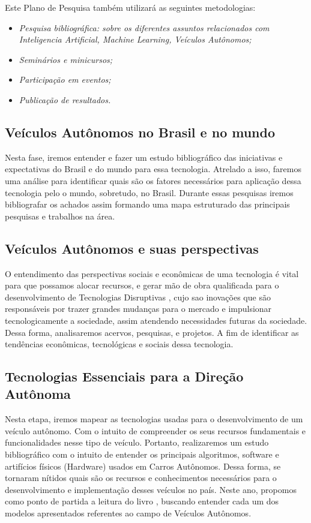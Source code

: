 \documentclass{article}
\begin{document}
\vspace {1mm}

Este Plano de Pesquisa também utilizará as seguintes metodologias:
\begin{itemize}
\item \textit{Pesquisa bibliográfica: sobre os diferentes assuntos relacionados com Inteligencia Artificial, Machine Learning, Veículos Autônomos;
}
\item \textit{Seminários e minicursos;}
\item \textit{Participação em eventos;}
\item \textit{Publicação de resultados.}

\end{itemize}


\subsection{Veículos Autônomos no Brasil e no mundo}

Nesta fase, iremos entender e fazer um estudo bibliográfico das iniciativas e expectativas do Brasil e do mundo para essa tecnologia. Atrelado a isso, faremos uma análise para identificar quais são os fatores necessários para aplicação dessa tecnologia pelo o mundo, sobretudo, no Brasil. Durante essas pesquisas iremos bibliografar os achados assim formando uma mapa estruturado das principais pesquisas e trabalhos na área.


\subsection{Veículos Autônomos e suas perspectivas}

O entendimento das perspectivas sociais e econômicas de uma tecnologia é vital para que possamos alocar recursos, e gerar mão de obra qualificada para o desenvolvimento de Tecnologias Disruptivas \cite{4cenarios_ocidental}, cujo sao inovações que são responsáveis por trazer grandes mudanças para o mercado e impulsionar tecnologicamente a sociedade, assim atendendo necessidades futuras da sociedade. 
Dessa forma,  analisaremos acervos, pesquisas, e projetos. A fim de identificar as tendências econômicas, tecnológicas e sociais dessa tecnologia.


\subsection{Tecnologias Essenciais para a Direção Autônoma}
Nesta etapa, iremos mapear as tecnologias usadas para o desenvolvimento de um veículo autônomo. Com o intuito de compreender os seus recursos fundamentais e funcionalidades nesse tipo de veículo.  Portanto, realizaremos um estudo bibliográfico com o intuito de entender os principais algoritmos, software e artifícios físicos (Hardware) usados em Carros Autônomos. Dessa forma, se tornaram nítidos quais são os recursos e conhecimentos necessários para o desenvolvimento e implementação desses veículos no país. Neste ano, propomos como ponto de partida a leitura do livro \cite{aurelien2017hands}, buscando entender cada um dos modelos apresentados referentes ao campo de Veículos Autônomos.
\end{document}
